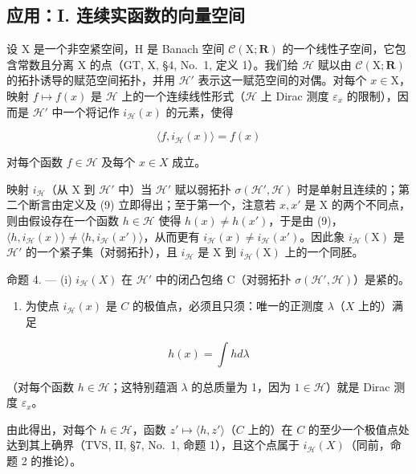 \subsection{应用：I. 连续实函数的向量空间}

设 X 是一个非空紧空间，H 是 Banach 空间 \(\mathcal{C}(\mathrm{X};\mathbf{R})\) 的一个线性子空间，它包含常数且分离 X 的点（GT, X, §4, No.~1, 定义 1）。我们给 \(\mathcal{H}\) 赋以由 \(\mathcal{C}(\mathrm{X};\mathbf{R})\) 的拓扑诱导的赋范空间拓扑，并用 \(\mathcal{H}'\) 表示这一赋范空间的对偶。对每个 \(x\in \mathrm{X}\)，映射 \(f\mapsto f(x)\) 是 \(\mathcal{H}\) 上的一个连续线性形式（\(\mathcal{H}\) 上 Dirac 测度 \(\varepsilon_{x}\) 的限制），因而是 \(\mathcal{H}'\) 中一个将记作 \(i_{\mathcal{H}}(x)\) 的元素，使得

\[
\langle f, i _ {\mathcal {H}} (x) \rangle = f (x)\tag{9}
\]

对每个函数 \(f \in \mathcal{H}\) 及每个 \(x \in X\) 成立。

映射 \(i_{\mathcal{H}}\)（从 X 到 \(\mathcal{H}'\) 中）当 \(\mathcal{H}'\) 赋以弱拓扑 \(\sigma(\mathcal{H}', \mathcal{H})\) 时是单射且连续的；第二个断言由定义及 (9) 立即得出；至于第一个，注意若 \(x, x'\) 是 X 的两个不同点，则由假设存在一个函数 \(h \in \mathcal{H}\) 使得 \(h(x) \neq h(x')\)，于是由 (9)，\(\langle h, i_{\mathcal{H}}(x) \rangle \neq \langle h, i_{\mathcal{H}}(x') \rangle\)，从而更有 \(i_{\mathcal{H}}(x) \neq i_{\mathcal{H}}(x')\)。因此象 \(i_{\mathcal{H}}(\mathrm{X})\) 是 \(\mathcal{H}'\) 的一个紧子集（对弱拓扑），且 \(i_{\mathcal{H}}\) 是 X 到 \(i_{\mathcal{H}}(\mathrm{X})\) 上的一个同胚。

命题 4. --- (i) \(i_{\mathcal{H}}(X)\) 在 \(\mathcal{H}'\) 中的闭凸包络 C（对弱拓扑 \(\sigma(\mathcal{H}', \mathcal{H})\)）是紧的。

\begin{enumerate}
\def\labelenumi{(\roman{enumi})}
\setcounter{enumi}{1}
\tightlist
\item
  为使点 \(i_{\mathcal{H}}(x)\) 是 \(C\) 的极值点，必须且只须：唯一的正测度 \(\lambda\)（\(X\) 上的）满足
\end{enumerate}

\[
h (x) = \int h d \lambda\tag{10}
\]

（对每个函数 \(h \in \mathcal{H}\)；这特别蕴涵 \(\lambda\) 的总质量为 1，因为 \(1 \in \mathcal{H}\)）就是 Dirac 测度 \(\varepsilon_x\)。

由此得出，对每个 \(h \in \mathcal{H}\)，函数 \(z' \mapsto \langle h, z' \rangle\)（\(C\) 上的）在 \(C\) 的至少一个极值点处达到其上确界（TVS, II, §7, No.~1, 命题 1），且这个点属于 \(i_{\mathcal{H}}(X)\)（同前，命题 2 的推论）。

